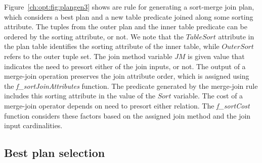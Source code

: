 Figure~\ref{ch:opt:fig:plangen3} shows are rule for generating a sort-merge
join plan, which considers a best plan and a new table predicate joined along
some sorting attribute.  The tuples from the outer plan and the inner table
predicate can be ordered by the sorting attribute, or not.  We note that the
$TableSort$ attribute in the  plan table identifies the sorting
attribute of the inner table, while $OuterSort$ refers to the outer tuple set.
The join method variable $JM$ is given value that indicates the need to presort
either of the join inputs, or not.  The output of a merge-join operation
preserves the join attribute order, which is assigned using the {\em
f\_sortJoinAttributes} function.  The  predicate generated by the
merge-join rule includes this sorting attribute in the value of the $Sort$
variable.  The cost of a merge-join operator depends on need to presort either
relation.  The {\em f\_sortCost} function considers these factors based on the
assigned join method and the join input cardinalities.

\subsection{Best plan selection}
\label{ch:opt:sec:bestplan}

